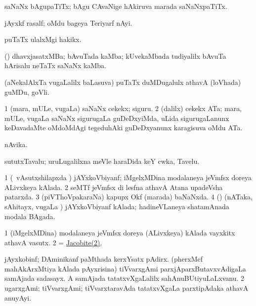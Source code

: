 \bentry
{}
\gl{\nA}
\bmng
saNaNx bAgupaTiTx; bAgu CAvaNige hAkiruva marada saNaNxpaTiTx. 
\emng
\eentry

\bentry
{}
\gl{\nA}
\bmng
jAyxkf rasalf; oMdu bageya Teriyarf nAyi. 
\emng
\eentry

\bentry
{}
\gl{\nA}
\bmng
puTaTx ulalxMgi hakikx. 
\emng
\eentry

\bentry
{}
\gl{\nA}
\bmng
(\nw) dhavxjasatxMBa; bAvuTada kaMba; kUvekaMbada tudiyalilx bAvuTa hArisalu neTaTx saNaNx kaMba. 
\emng
\eentry

\bentry
{}
\gl{\nA}
\bmng
(aNekalAlxTa \mo vugaLalilx baLasuva) puTaTx duMDugalulx athavA (loVhada) guMDu, goVli. 
\emng
\eentry

\bentry
{}
\gl{\nA}
\bmng
\bnum
\num{1} (mara, mULe, \mo vugaLa) saNaNx cekekx; siguru. 
\num{2} (\bava dalilx) cekekx ATa; mara, mULe, \mo vugaLa saNaNx sigurugaLa guDeDxyiMda, uLida sigurugaLanunx keDavadaMte oMdoMdAgi tegeduhAki guDeDxyanunx karagisuva oMdu ATa. 
\enum
\emng
\eentry

\bentry
{}
\gl{\nA}
\bmng
nAvika. 
\emng
\eentry

\bentry
{}
\gl{\nA}
\bmng
sututxTavalu; uruLugalilxna meVle haraDida keY cwka, Tavelu. 
\emng
\eentry

\bentry
{}
\gl{\gu}
\bmng
\bnum
\num{1} (\kanmu\ vAsutxshilapxda \vi) jAYxkoVbiyanf; iMgelxMDina modalaneya jeVmfsx doreya ALivxkeya  kAlada. 
\num{2} seMTf jeVmfsx di lesfna athavA Atana upadeVsha patarxda. 
\num{3} (piVThoVpakaraNa) kapupx Okf (marada) baNaNxda. 
\num{4} (\birx) (nATaka, sAhitayx, \mo vugaLa \vi) jAYxkoVbiyanf kAlada; hadineVLaneya shatamAnada modala BAgada. 
\enum
\emng
\eentry

\bentry
{}
\gl{\nA}
\bmng
\bnum
\num{1} (iMgelxMDina) modalaneya jeVmfsx doreya (ALivxkeya) kAlada vayxkitx athavA vasutx. 
\num{2}  = \hyperlink{Jacobite(2)}{Jacobite(2)}. 
\enum
\emng
\eentry

\bentry
{}
\gl{\nA}
\bmng
\bnum
{} jAyxkobinf; 
\banum
{} DAminikanf paMthada kerxYsatx pAdirx. 
 (pherxMcf mahAkArxMtiya kAlada pAyxrisina) tiVvarxgAmi parxjAparxButavxvAdigaLa samAjada sadasayx. 
 A samAjada tatatxvXgaLalilx sahAnuBUtiyuLaLxvanu. 
\eanum
\numie
\num{2} ugarxgAmi; tiVvarxgAmi; tiVvarxtaravAda tatatxvXgaLa parxtipAdaka athavA anuyAyi. 
\enum
\emng
\eentry

